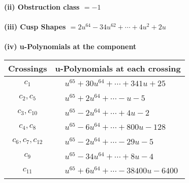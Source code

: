 \documentclass[1p]{elsarticle_modified}
\theoremstyle{definition}
\begin{document}
\flushleft \textbf{(ii) Obstruction class $= -1$}\\~\\
\flushleft \textbf{(iii) Cusp Shapes $= 2 u^{64}-34 u^{62}+\cdots+4 u^2+2 u$}\\~\\
\newpage\renewcommand{\arraystretch}{1}
\flushleft \textbf{(iv) u-Polynomials at the component}\newline \\
\begin{tabular}{m{50pt}|m{274pt}}
Crossings & \hspace{64pt}u-Polynomials at each crossing \\
\hline $$\begin{aligned}c_{1}\end{aligned}$$&$\begin{aligned}
&u^{65}+30 u^{64}+\cdots+341 u+25
\end{aligned}$\\
\hline $$\begin{aligned}c_{2},c_{5}\end{aligned}$$&$\begin{aligned}
&u^{65}+2 u^{64}+\cdots- u-5
\end{aligned}$\\
\hline $$\begin{aligned}c_{3},c_{10}\end{aligned}$$&$\begin{aligned}
&u^{65}-2 u^{64}+\cdots+4 u-2
\end{aligned}$\\
\hline $$\begin{aligned}c_{4},c_{8}\end{aligned}$$&$\begin{aligned}
&u^{65}-6 u^{64}+\cdots+800 u-128
\end{aligned}$\\
\hline $$\begin{aligned}c_{6},c_{7},c_{12}\end{aligned}$$&$\begin{aligned}
&u^{65}-2 u^{64}+\cdots-29 u-5
\end{aligned}$\\
\hline $$\begin{aligned}c_{9}\end{aligned}$$&$\begin{aligned}
&u^{65}-34 u^{64}+\cdots+8 u-4
\end{aligned}$\\
\hline $$\begin{aligned}c_{11}\end{aligned}$$&$\begin{aligned}
&u^{65}+6 u^{64}+\cdots-38400 u-6400
\end{aligned}$\\
\hline
\end{tabular}\\~\\
\end{document}
